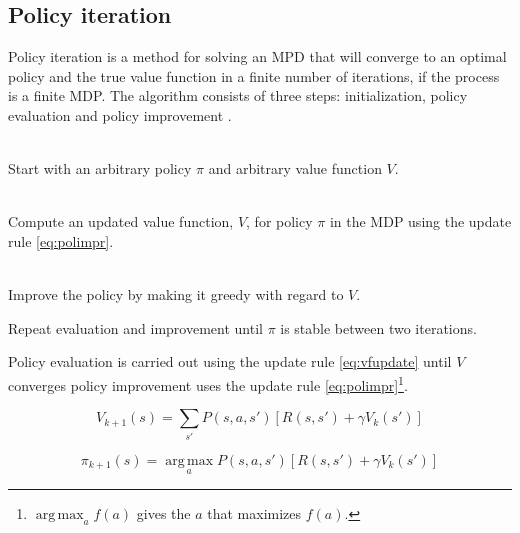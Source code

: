 \subsection{Policy iteration}
\label{sec:pol_itr}

Policy iteration is a method for solving an MPD that will converge to an
optimal policy and the true value function in a finite number of iterations, if
the process is a finite MDP. The algorithm consists of three steps:
initialization, policy evaluation and policy improvement
\parencite{barto1998reinforcement}.

\begin{description}
\item[Initialization] \hfill \\
    Start with an arbitrary policy $\pi$ and arbitrary value function $V$.
\item[Policy evaluation] \hfill \\
    Compute an updated value function, $V$, for policy $\pi$ in the MDP using the update rule \eqref{eq:polimpr}.
\item[Policy improvement] \hfill \\
    Improve the policy by making it greedy with regard to $V$.
\item Repeat evaluation and improvement until $\pi$ is stable between two iterations.
\end{description}

Policy evaluation is carried out using the update rule \eqref{eq:vfupdate} until $V$ converges
policy improvement uses the update rule \eqref{eq:polimpr}\footnote{$\operatorname*{arg\,max} _a f(a)$ gives the $a$ that maximizes $f(a)$.}.


\begin{equation} \label{eq:vfupdate}
V_{k+1} (s) = \sum_{s'} P(s, a, s') \left[ R(s, s') + \gamma V_k(s')  \right]
\end{equation}

\begin{equation} \label{eq:polimpr}
\pi_{k+1} (s) = \operatorname*{arg\,max}_a P(s, a, s') \left[ R(s, s') + \gamma V_k(s') \right]
\end{equation}

